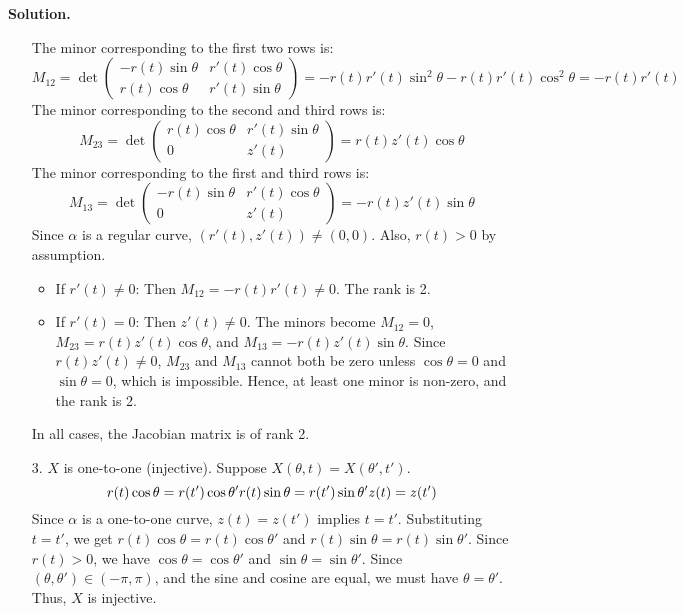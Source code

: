 \documentclass[12pt, a4paper, oneside]{article}
\newenvironment{solution}
  {\par\noindent\textbf{Solution. }\newline}
  {\par}
\begin{document}
\begin{solution}
\begin{enumerate}
    The minor corresponding to the first two rows is:
    $$
    M_{12} = \det \begin{pmatrix}
    -r(t)\sin\theta & r'(t)\cos\theta \\
    r(t)\cos\theta & r'(t)\sin\theta
    \end{pmatrix} = -r(t)r'(t)\sin^2\theta - r(t)r'(t)\cos^2\theta = -r(t)r'(t)
    $$
    The minor corresponding to the second and third rows is:
    $$
    M_{23} = \det \begin{pmatrix}
    r(t)\cos\theta & r'(t)\sin\theta \\
    0 & z'(t)
    \end{pmatrix} = r(t)z'(t)\cos\theta
    $$
    The minor corresponding to the first and third rows is:
    $$
    M_{13} = \det \begin{pmatrix}
    -r(t)\sin\theta & r'(t)\cos\theta \\
    0 & z'(t)
    \end{pmatrix} = -r(t)z'(t)\sin\theta
    $$
    Since $\alpha$ is a regular curve, $(r'(t), z'(t)) \neq (0,0)$. Also, $r(t)>0$ by assumption.
    \begin{itemize}
        \item If $r'(t) \neq 0$: Then $M_{12} = -r(t)r'(t) \neq 0$. The rank is 2.
        \item If $r'(t) = 0$: Then $z'(t) \neq 0$. The minors become $M_{12}=0$, $M_{23} = r(t)z'(t)\cos\theta$, and $M_{13} = -r(t)z'(t)\sin\theta$. Since $r(t)z'(t)\neq 0$, $M_{23}$ and $M_{13}$ cannot both be zero unless $\cos\theta=0$ and $\sin\theta=0$, which is impossible. Hence, at least one minor is non-zero, and the rank is 2.
    \end{itemize}
    In all cases, the Jacobian matrix is of rank 2.

    \item[3.] $X$ is one-to-one (injective).
    Suppose $X(\theta, t) = X(\theta', t')$.
    $$
    r(t)\cos\theta = r(t')\cos\theta' \\
    r(t)\sin\theta = r(t')\sin\theta' \\
    z(t) = z(t')
    $$
    Since $\alpha$ is a one-to-one curve, $z(t)=z(t')$ implies $t=t'$.
    Substituting $t=t'$, we get $r(t)\cos\theta = r(t)\cos\theta'$ and $r(t)\sin\theta = r(t)\sin\theta'$. Since $r(t)>0$, we have $\cos\theta = \cos\theta'$ and $\sin\theta = \sin\theta'$.
    Since $(\theta, \theta') \in (-\pi, \pi)$, and the sine and cosine are equal, we must have $\theta=\theta'$.
    Thus, $X$ is injective.


\end{enumerate}
\end{solution}
\end{document}
